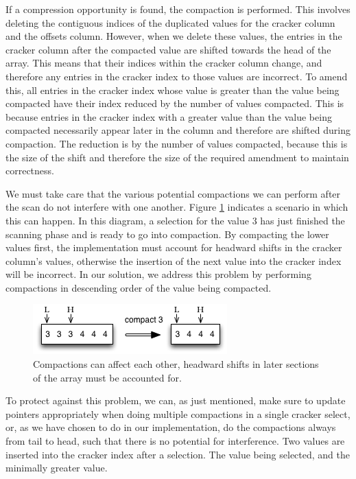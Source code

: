 If a compression opportunity is found, the compaction is performed. This involves deleting the contiguous indices of the duplicated values for the cracker column and the offsets column. However, when we delete these values, the entries in the cracker column after the compacted value are shifted towards the head of the array. This means that their indices within the cracker column change, and therefore any entries in the cracker index to those values are incorrect. To amend this, all entries in the cracker index whose value is greater than the value being compacted have their index reduced by the number of values compacted. This is because entries in the cracker index with a greater value than the value being compacted necessarily appear later in the column and therefore are shifted during compaction. The reduction is by the number of values compacted, because this is the size of the shift and therefore the size of the required amendment to maintain correctness.

We must take care that the various potential compactions we can perform after the scan do not interfere with one another. Figure \ref{fig:compact_in_correct_order} indicates a scenario in which this can happen. In this diagram, a selection for the value 3 has just finished the scanning phase and is ready to go into compaction. By compacting the lower values first, the implementation must account for headward shifts in the cracker column's values, otherwise the insertion of the next value into the cracker index will be incorrect. In our solution, we address this problem by performing compactions in descending order of the value being compacted.

\begin{figure}[H]
  \centering
  \includegraphics[]{images/d7_compaction_compact_in_correct_order}
  \caption{Compactions can affect each other, headward shifts in later sections of the array must be accounted for.}
  \label{fig:compact_in_correct_order}
\end{figure}

To protect against this problem, we can, as just mentioned, make sure to update pointers appropriately when doing multiple compactions in a single cracker select, or, as we have chosen to do in our implementation, do the compactions always from tail to head, such that there is no potential for interference. Two values are inserted into the cracker index after a selection. The value being selected, and the minimally greater value.

